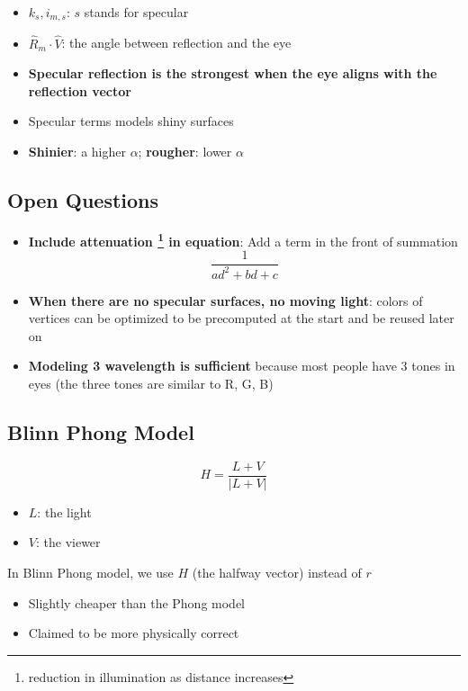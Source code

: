     \begin{itemize}
      \item $ k_{s}, i_{m, s} $: $ s $ stands for specular
      \item $ \hat{R}_{m} \cdot \hat{V} $: the angle between reflection and
      the eye
      \item \textbf{Specular reflection is the strongest when the eye aligns
      with the reflection vector}
      \item Specular terms models shiny surfaces
      \item \textbf{Shinier}: a higher $ \alpha $; \textbf{rougher}:
      lower $ \alpha $
    \end{itemize}

\subsection{Open Questions}

  \begin{itemize}
    \item \textbf{Include attenuation
    \footnote{reduction in illumination as distance increases} in equation}:
    Add a term in the front of summation
    \begin{equation*}
      \frac{1}{ad^{2} + bd + c}
    \end{equation*}

    \item \textbf{When there are no specular surfaces, no moving light}:
    colors of vertices can be optimized to be precomputed at the start and
    be reused later on

    \item \textbf{Modeling 3 wavelength is sufficient} because most people
    have 3 tones in eyes (the three tones are similar to R, G, B)
  \end{itemize}

\subsection{Blinn Phong Model}

  \begin{equation}
    H = \frac{L + V}{\left| L + V \right|}
  \end{equation}

  \begin{itemize}
    \item $ L $: the light
    \item $ V $: the viewer
  \end{itemize}

  In Blinn Phong model, we use $ H $ (the halfway vector) instead of $ r $

  \begin{itemize}
    \item Slightly cheaper than the Phong model
    \item Claimed to be more physically correct
  \end{itemize}
